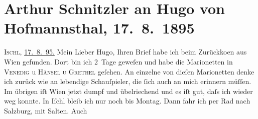 

         
         \renewcommand{\erwaehntePersonen}{Personen: Lou Andreas-Salomé, Richard Beer-Hofmann, Paul Goldmann, Hugo von Hofmannsthal, Fedor Mamroth, Felix Salten}
         \renewcommand{\erwaehnteOrte}{Orte: Bad Ischl, Hodonín, München, Salzburg, Venedig in Wien, Wien}
         \renewcommand{\erwaehnteWerke}{Werke: Die Frau des Weisen. Erzählung, Ein Abschied, Freiwild. Schauspiel in 3 Akten, Hänsel und Grethel}
               \section[Arthur Schnitzler an Hugo von Hofmannsthal, 17. 8. 1895]{ Arthur Schnitzler an Hugo von Hofmannsthal, 17. 8. 1895}\nopagebreak{}\rehead{ }\begin{ledgroupsized}[t]{13cm}\normalsize\beginnumbering{} \toendnotes[C]{\smallbreak\pagebreak[2]} 
\toendnotes[C]{\smallbreak}\pstart
           \raggedleft{}{\pb}\textsc{Ischl}, \uline{17. 8. 95.}\pend
           \pstart
           Mein Lieber Hugo, Ihren Brief habe ich beim Zurückko{\geminationm}en aus Wien
               gefunden. Dort bin ich 2 Tage geweſen und habe die Marionetten in \textsc{Venedig} u \textsc{Hänsel u Grethel} geſehen. An einzelne von dieſen Marionetten denke ich zurück wie an lebendige
               Schauſpieler, die ſich auch an mich erinnern müſſen. Im übrigen iſt Wien jetzt dumpf und übelriechend und es iſt gut, daſs ich
               wieder weg konnte. In Iſchl bleib ich nur noch
               bis Montag. Dann fahr ich per Rad nach Salzburg,
               mit Salten. {\pb}Auch

\end{ledgroupsized}
